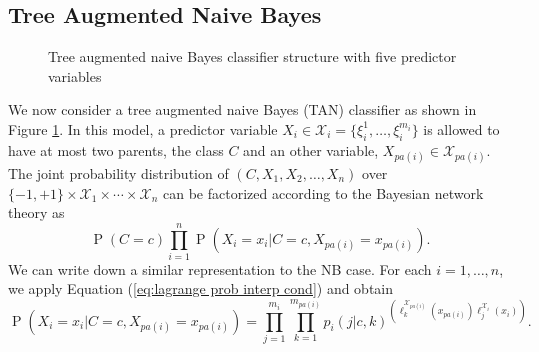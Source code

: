 \documentclass[11pt,a4paper, twoside]{book}
\newcommand{\Pp}{\operatorname{P}}
\newcommand{\nchi}{\mathcal{X}}
\begin{document}
\subsection{Tree Augmented Naive Bayes}
\label{subsec:TAN}
\begin{figure}
\centering
{}  
\caption{Tree augmented naive Bayes classifier structure with five predictor variables}
\label{fig:TAN}
\end{figure}
We now consider a tree augmented naive Bayes (TAN) classifier \citep{Friedman1997} as shown in Figure \ref{fig:TAN}. In this model, a predictor variable $X_i\in \nchi_i=\{\xi_i^1,\ldots,\xi_i^{m_i}\}$ is allowed to have at most two parents, the class $C$ and an other variable, $X_{pa(i)}\in \nchi_{pa(i)}$.     
The joint probability distribution of $(C,X_1,X_2,\ldots ,X_n)$ over $\{-1,+1\}\times\nchi_1\times\cdots\times\nchi_n$ can be factorized according to the Bayesian network theory as
\begin{equation} \Pp\left(C=c\right)\prod_{i=1}^n \Pp\left(X_i=x_i|C=c, X_{pa(i)}=x_{pa(i)}\right) .\label{eq:tan fact}  \end{equation}
We can write down a similar representation to the NB case.
For each $i=1, \ldots,n$, we apply Equation (\ref{eq:lagrange prob interp cond}) and obtain 
\begin{equation}
\label{eq:conprob}
\Pp\left( X_i=x_i|C=c,X_{pa(i)}=x_{pa(i)} \right)=\prod_{j=1}^{m_i}\prod_{k=1}^{m_{pa(i)}}p_{i}(j|c,k)^{ \left( \ell_{k}^{\nchi_{pa(i)}}(x_{pa(i)})  \ell_{j}^{\nchi_i}(x_i) \right) }.
\end{equation}
\end{document}
